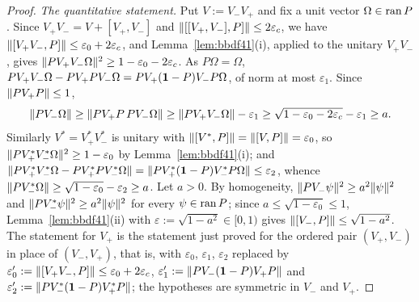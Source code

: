 \begin{proof}
\emph{The quantitative statement.} Put $V:=V_-V_+$ and fix a unit vector $\Omega\in\operatorname{ran} P$. Since
$V_+V_-=V+[V_+,V_-]$ and $\lVert[[V_+,V_-],P]\rVert\le2\varepsilon_c$, we have $\lVert[V_+V_-,P]\rVert\le\varepsilon_0+2\varepsilon_c$, and
Lemma~\ref{lem:bbdf41}(i), applied to the unitary $V_+V_-$, gives $\lVert PV_+V_-\Omega\rVert^2\ge1-\varepsilon_0-2\varepsilon_c$. As
$P\Omega=\Omega$, $PV_+V_-\Omega-PV_+PV_-\Omega=PV_+(\mathbf{1}-P)V_-P\Omega$, of norm at most $\varepsilon_1$. Since $\lVert PV_+P\rVert\le1$,
\[
\lVert PV_-\Omega\rVert\ge\lVert PV_+P\,PV_-\Omega\rVert\ge\lVert PV_+V_-\Omega\rVert-\varepsilon_1\ge\sqrt{1-\varepsilon_0-2\varepsilon_c}-\varepsilon_1\ge a .
\]
Similarly $V^*=V_+^*V_-^*$ is unitary with $\lVert[V^*,P]\rVert=\lVert[V,P]\rVert=\varepsilon_0$, so $\lVert PV_+^*V_-^*\Omega\rVert^2\ge1-\varepsilon_0$ by
Lemma~\ref{lem:bbdf41}(i); and $\lVert PV_+^*V_-^*\Omega-PV_+^*PV_-^*\Omega\rVert=\lVert PV_+^*(\mathbf{1}-P)V_-^*P\Omega\rVert\le \varepsilon_2$, whence
$\lVert PV_-^*\Omega\rVert\ge\sqrt{1-\varepsilon_0}-\varepsilon_2\ge a$. Let $a>0$. By homogeneity, $\lVert PV_-\psi\rVert^2\ge a^2\lVert\psi\rVert^2$ and
$\lVert PV_-^*\psi\rVert^2\ge a^2\lVert\psi\rVert^2$ for every $\psi\in\operatorname{ran} P$; since $a\le\sqrt{1-\varepsilon_0}\le1$,
Lemma~\ref{lem:bbdf41}(ii) with $\varepsilon:=\sqrt{1-a^2}\in[0,1)$ gives $\lVert[V_-,P]\rVert\le\sqrt{1-a^2}$. The statement for
$V_+$ is the statement just proved for the ordered pair $(V_+,V_-)$ in place of $(V_-,V_+)$, that is, with $\varepsilon_0$,
$\varepsilon_1$, $\varepsilon_2$ replaced by $\varepsilon_0':=\lVert[V_+V_-,P]\rVert\le\varepsilon_0+2\varepsilon_c$, $\varepsilon_1':=\lVert PV_-(\mathbf{1}-P)V_+P\rVert$ and
$\varepsilon_2':=\lVert PV_-^*(\mathbf{1}-P)V_+^*P\rVert$; the hypotheses are symmetric in $V_-$ and $V_+$.


\end{proof}
